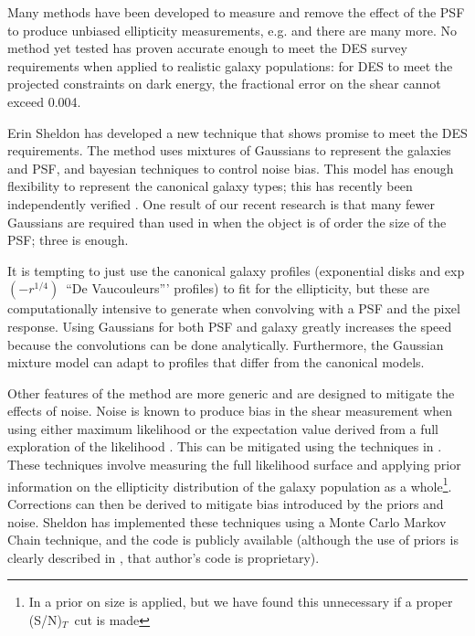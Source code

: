 \documentclass[12pt]{article}
\newcommand{\devauc}{De Vaucouleurs'}
\newcommand{\devprof}{exp$(-r^{1/4})$}
\newcommand{\snsize}{(S/N)$_{T}$}
\begin{document}
Many methods have been developed to measure and remove the effect of the PSF to
produce unbiased ellipticity measurements, e.g.
\cite{ksb95,Bern02,Miller07,Melchior11} and there are many more.  No method yet
tested has proven accurate enough to meet the DES survey requirements when
applied to realistic galaxy populations:  for DES to meet the projected
constraints on dark energy, the fractional error on the shear cannot exceed
0.004.

Erin Sheldon has developed a new technique that shows promise to meet the DES
requirements.  The method uses mixtures of Gaussians to represent the galaxies
and PSF, and bayesian techniques to control noise bias.  This model has enough
flexibility to represent the canonical galaxy types; this has recently been
independently verified \citep{HoggGMix12}.  One result of our recent research
is that many fewer Gaussians are required than used in \cite{HoggGMix12} when
the object is of order the size of the PSF; three is enough.  

It is tempting to just use the canonical galaxy profiles (exponential disks and
\devprof\ ``\devauc'' profiles) to fit for the ellipticity, but these are
computationally intensive to generate when convolving with a PSF and the pixel
response.  Using Gaussians for both PSF and galaxy greatly increases the speed
because the convolutions can be done analytically.   Furthermore, the Gaussian
mixture model can adapt to profiles that differ from the canonical models.

Other features of the method are more generic and are designed to mitigate the
effects of noise.  Noise is known to produce bias in the shear measurement when
using either maximum likelihood \cite{Refreg12} or the expectation value
derived from a full exploration of the likelihood \cite{Miller12}.  This can be
mitigated using the techniques in \cite{Miller07,Miller12}. These techniques
involve measuring the full likelihood surface and applying prior information on
the ellipticity distribution of the galaxy population as a whole\footnote{In
\cite{Miller12} a prior on size is applied, but we have found this unnecessary
if a proper \snsize\ cut is made}.
Corrections can then be derived to mitigate bias introduced by the priors and
noise.  Sheldon has implemented these techniques using a Monte Carlo Markov
Chain technique, and the code is publicly available (although the use of priors
is clearly described in \cite{Miller07}, that author's code is proprietary).
\end{document}
